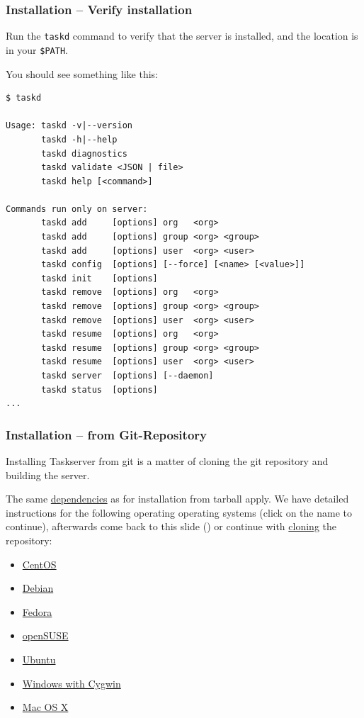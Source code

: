 \documentclass[t,handout]{beamer}
\begin{document}
\begin{frame}[fragile]\frametitle{Installation -- Verify installation}
    \vfill
    Run the \verb+taskd+ command to verify that the server is installed, and the location is in your \verb+$PATH+.

    You should see something like this:

    \begin{lstlisting}
$ taskd

Usage: taskd -v|--version
       taskd -h|--help
       taskd diagnostics
       taskd validate <JSON | file>
       taskd help [<command>]

Commands run only on server:
       taskd add     [options] org   <org>
       taskd add     [options] group <org> <group>
       taskd add     [options] user  <org> <user>
       taskd config  [options] [--force] [<name> [<value>]]
       taskd init    [options]
       taskd remove  [options] org   <org>
       taskd remove  [options] group <org> <group>
       taskd remove  [options] user  <org> <user>
       taskd resume  [options] org   <org>
       taskd resume  [options] group <org> <group>
       taskd resume  [options] user  <org> <user>
       taskd server  [options] [--daemon]
       taskd status  [options]
...\end{lstlisting}
\end{frame}

\begin{frame}[fragile]\frametitle{Installation -- from Git-Repository}\label{git}
    \vfill
    Installing Taskserver from git is a matter of cloning the git repository and building the server.

    The same \hyperlink{dependencies}{dependencies} as for installation from tarball apply. We have detailed instructions for the following operating operating systems (click on the name to continue), afterwards come back to this slide (\pageref{git}) or continue with \hyperlink{cloning}{cloning} the repository:

    \begin{itemize}
        \item \hyperlink{centos}{CentOS}
        \item \hyperlink{debian}{Debian}
        \item \hyperlink{fedora}{Fedora}
        \item \hyperlink{opensuse}{openSUSE}
        \item \hyperlink{ubuntu}{Ubuntu}
        \item \hyperlink{windows}{Windows with Cygwin}
        \item \hyperlink{macosx}{Mac OS X}
    \end{itemize}
\end{frame}
\end{document}
